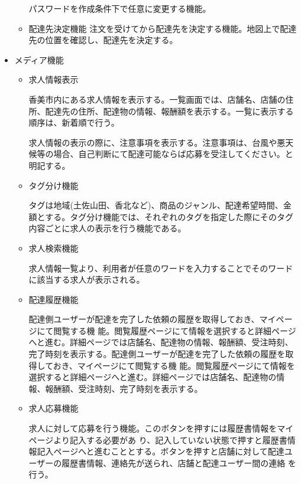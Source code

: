 \begin{itemize}
\begin{itemize}
        パスワードを作成条件下で任意に変更する機能。
        \item 配達先決定機能
        注文を受けてから配達先を決定する機能。地図上で配達先の位置を確認し、配達先を決定する。
        
    \end{itemize}
  \item メディア機能
  \begin{itemize}
      \item 求人情報表示
      
      香美市内にある求人情報を表示する。一覧画面では、店舗名、店舗の住所、配達先の住所、配達物の情報、報酬額を表示する。一覧に表示する順序は、新着順で行う。

      求人情報の表示の際に、注意事項を表示する。注意事項は、台風や悪天候等の場合、自己判断にて配達可能ならば応募を受注してください。と明記する。

      
      \item タグ分け機能
      
      タグは地域(土佐山田、香北など)、商品のジャンル、配達希望時間、金額とする。タグ分け機能では、それぞれのタグを指定した際にそのタグ内容ごとに求人の表示を行う機能である。
      
      \item 求人検索機能
      
      求人情報一覧より、利用者が任意のワードを入力することでそのワードに該当する求人が表示される。
    
      
      \item 配達履歴機能
      
      配達側ユーザーが配達を完了した依頼の履歴を取得しておき、マイページにて閲覧する機 能。閲覧履歴ページにて情報を選択すると詳細ページへと進む。詳細ページでは店舗名、配達物の情報、報酬額、受注時刻、完了時刻を表示する。配達側ユーザーが配達を完了した依頼の履歴を取得しておき、マイページにて閲覧する機 能。閲覧履歴ページにて情報を選択すると詳細ページへと進む。詳細ページでは店舗名、配達物の情報、報酬額、受注時刻、完了時刻を表示する。
      \item 求人応募機能
      
      求人に対して応募を行う機能。このボタンを押すには履歴書情報をマイページより記入する必要があ り、記入していない状態で押すと履歴書情報記入ページへと進むこととする。ボタンを押すと店舗に対して配達ユーザーの履歴書情報、連絡先が送られ、店舗と配達ユーザー間の連絡 を行う。
  \end{itemize}
\end{itemize}


